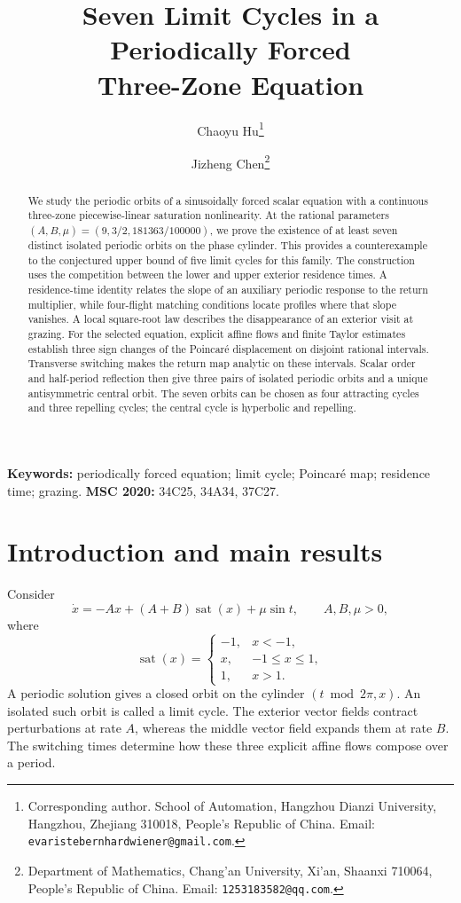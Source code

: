 \documentclass[11pt,a4paper]{article}
\title{Seven Limit Cycles in a Periodically Forced\\Three-Zone Equation}
\author{Chaoyu Hu\thanks{Corresponding author. School of Automation, Hangzhou Dianzi University, Hangzhou, Zhejiang 310018, People's Republic of China. Email: \texttt{evaristebernhardwiener@gmail.com}.}
\and Jizheng Chen\thanks{Department of Mathematics, Chang'an University, Xi'an, Shaanxi 710064, People's Republic of China. Email: \texttt{1253183582@qq.com}.}}
\date{}
\newcommand{\sat}{\operatorname{sat}}
\begin{document}
\maketitle
\begin{abstract}
We study the periodic orbits of a sinusoidally forced scalar equation
with a continuous three-zone piecewise-linear saturation nonlinearity.
At the rational parameters $(A,B,\mu)=(9,3/2,181363/100000)$, we prove
the existence of at least seven distinct isolated periodic orbits on
the phase cylinder. This provides a counterexample to the conjectured
upper bound of five limit cycles for this family. The construction
uses the competition between the lower and upper exterior residence
times. A residence-time identity relates the slope of an auxiliary
periodic response to the return multiplier, while four-flight matching
conditions locate profiles where that slope vanishes. A local
square-root law describes the disappearance of an exterior visit at
grazing. For the selected equation, explicit affine flows and finite
Taylor estimates establish three sign changes of the Poincar\'e
displacement on disjoint rational intervals. Transverse switching
makes the return map analytic on these intervals. Scalar order and
half-period reflection then give three pairs of isolated periodic
orbits and a unique antisymmetric central orbit. The seven orbits can
be chosen as four attracting cycles and three repelling cycles; the
central cycle is hyperbolic and repelling.
\end{abstract}
\noindent\textbf{Keywords:} periodically forced equation; limit cycle;
Poincar\'e map; residence time; grazing.\quad
\textbf{MSC 2020:} 34C25, 34A34, 37C27.

\section{Introduction and main results}
Consider
\begin{equation}\label{eq:family}
 \dot x=-Ax+(A+B)\sat(x)+\mu\sin t,\qquad A,B,\mu>0,
\end{equation}
where
\[
 \sat(x)=\begin{cases}-1,&x<-1,\\x,&-1\le x\le1,\\1,&x>1.\end{cases}
\]
A periodic solution gives a closed orbit on the cylinder
$(t\bmod 2\pi,x)$. An isolated such orbit is called a limit cycle.
The exterior vector fields contract perturbations at rate $A$, whereas
the middle vector field expands them at rate $B$. The switching times
determine how these three explicit affine flows compose over a period.
\end{document}
